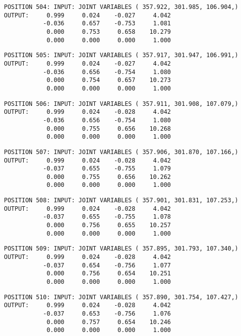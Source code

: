 \begin{verbatim}
POSITION 504: INPUT: JOINT VARIABLES ( 357.922, 301.985, 106.904,)
OUTPUT:     0.999     0.024    -0.027     4.042
           -0.036     0.657    -0.753     1.081
            0.000     0.753     0.658    10.279
            0.000     0.000     0.000     1.000
\end{verbatim} \pagebreak[1]\begin{verbatim}
POSITION 505: INPUT: JOINT VARIABLES ( 357.917, 301.947, 106.991,)
OUTPUT:     0.999     0.024    -0.027     4.042
           -0.036     0.656    -0.754     1.080
            0.000     0.754     0.657    10.273
            0.000     0.000     0.000     1.000
\end{verbatim} \pagebreak[1]\begin{verbatim}
POSITION 506: INPUT: JOINT VARIABLES ( 357.911, 301.908, 107.079,)
OUTPUT:     0.999     0.024    -0.028     4.042
           -0.036     0.656    -0.754     1.080
            0.000     0.755     0.656    10.268
            0.000     0.000     0.000     1.000
\end{verbatim} \pagebreak[1]\begin{verbatim}
POSITION 507: INPUT: JOINT VARIABLES ( 357.906, 301.870, 107.166,)
OUTPUT:     0.999     0.024    -0.028     4.042
           -0.037     0.655    -0.755     1.079
            0.000     0.755     0.656    10.262
            0.000     0.000     0.000     1.000
\end{verbatim} \pagebreak[1]\begin{verbatim}
POSITION 508: INPUT: JOINT VARIABLES ( 357.901, 301.831, 107.253,)
OUTPUT:     0.999     0.024    -0.028     4.042
           -0.037     0.655    -0.755     1.078
            0.000     0.756     0.655    10.257
            0.000     0.000     0.000     1.000
\end{verbatim} \pagebreak[1]\begin{verbatim}
POSITION 509: INPUT: JOINT VARIABLES ( 357.895, 301.793, 107.340,)
OUTPUT:     0.999     0.024    -0.028     4.042
           -0.037     0.654    -0.756     1.077
            0.000     0.756     0.654    10.251
            0.000     0.000     0.000     1.000
\end{verbatim} \pagebreak[1]\begin{verbatim}
POSITION 510: INPUT: JOINT VARIABLES ( 357.890, 301.754, 107.427,)
OUTPUT:     0.999     0.024    -0.028     4.042
           -0.037     0.653    -0.756     1.076
            0.000     0.757     0.654    10.246
            0.000     0.000     0.000     1.000
\end{verbatim} \pagebreak[1]\begin{verbatim}

\end{verbatim}
